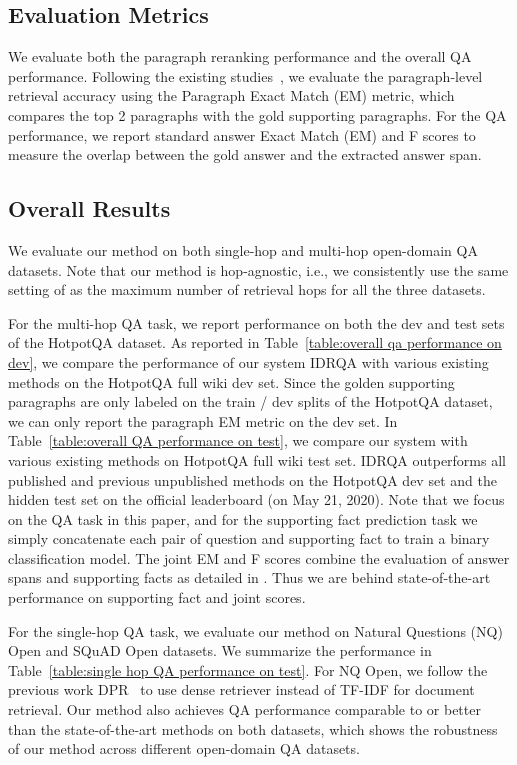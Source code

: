 \documentclass[sigconf]{acmart}
\begin{document}
\subsection{Evaluation Metrics}

We evaluate both the paragraph reranking performance and the overall QA performance. Following the existing studies~\cite{asai2020learning,nie-etal-2019-revealing,nishida-etal-2019-answering}, we evaluate the paragraph-level retrieval accuracy using the Paragraph Exact Match (EM) metric, which compares the top 2 paragraphs with the gold supporting paragraphs. For the QA performance, we report standard answer Exact Match (EM) and F scores to measure the overlap between the gold answer and the extracted answer span.



\subsection{Overall Results}

We evaluate our method on both single-hop and multi-hop open-domain QA datasets. Note that our method is hop-agnostic, i.e., we consistently use the same setting of  as the maximum number of retrieval hops for all the three datasets.

For the multi-hop QA task, we report performance on both the dev and test sets of the HotpotQA dataset.
As reported in Table~\ref{table:overall qa performance on dev}, we compare the performance of our system IDRQA with various existing methods on the HotpotQA full wiki dev set. Since the golden supporting paragraphs are only labeled on the train / dev splits of the HotpotQA dataset, we can only report the paragraph EM metric on the dev set.
In Table~\ref{table:overall QA performance on test}, we compare our system with various existing methods on HotpotQA full wiki test set. IDRQA outperforms all published and previous unpublished methods on the HotpotQA dev set and the hidden test set on the official leaderboard (on May 21, 2020). 
Note that we focus on the QA task in this paper, and for the supporting fact prediction task we simply concatenate each pair of question and supporting fact to train a binary classification model. The joint EM and F scores combine the evaluation of answer spans and supporting facts as detailed in \cite{yang-etal-2018-hotpotqa}. Thus we are behind state-of-the-art performance on supporting fact and joint scores.

For the single-hop QA task, we evaluate our method on Natural Questions (NQ) Open and SQuAD Open datasets. We summarize the performance in Table~\ref{table:single hop QA performance on test}. For NQ Open, we follow the previous work DPR~\cite{karpukhin2020dense} to use dense retriever instead of TF-IDF for document retrieval. Our method also achieves QA performance comparable to or better than the state-of-the-art methods on both datasets, which shows the robustness of our method across different open-domain QA datasets.
\end{document}
